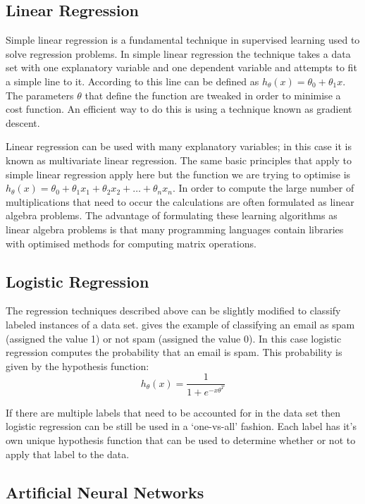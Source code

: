 \subsection{Linear Regression}

Simple linear regression is a fundamental technique in supervised learning used to solve regression problems. In simple linear regression the technique takes a data set with one explanatory variable and one dependent variable and attempts to fit a simple line to it. According to \cite{ng2000cs229} this line can be defined as $h_{\theta}(x) = \theta_0 + \theta_1 x$. The parameters $\theta$ that define the function are tweaked in order to minimise a cost function. An efficient way to do this is using a technique known as gradient descent.

Linear regression can be used with many explanatory variables; in this case it is known as multivariate linear regression. The same basic principles that apply to simple linear regression apply here but the function we are trying to optimise is  $h_{\theta}(x) = \theta_0 + \theta_1 x_1 + \theta_2 x_2 + \ldots + \theta_n x_n$. In order to compute the large number of multiplications that need to occur the calculations are often formulated as linear algebra problems. The advantage of formulating these learning algorithms as linear algebra problems is that many programming languages contain libraries with optimised methods for computing matrix operations.

\subsection{Logistic Regression}

The regression techniques described above can be slightly modified to classify labeled instances of a data set. \cite{ng2000cs229} gives the example of classifying an email as spam (assigned the value 1) or not spam (assigned the value 0). In this case logistic regression computes the probability that an email is spam. This probability is given by the hypothesis function:
$$h_\theta(x) = \frac{1}{1 + e^{-x\theta^T}}$$

If there are multiple labels that need to be accounted for in the data set then logistic regression can be still be used in a `one-vs-all' fashion. Each label has it's own unique hypothesis function that can be used to determine whether or not to apply that label to the data.

\subsection{Artificial Neural Networks}

